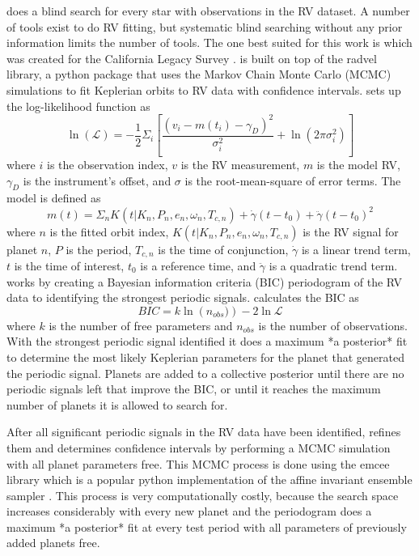 does a blind search for every star with observations in the RV
dataset. A number of tools exist to do RV fitting, but systematic
blind searching without any prior information limits the number of tools. The
one best suited for this work is  which was created for the California
Legacy Survey \citep{rosenthalCaliforniaLegacy2021}.  is built on top of the radvel library, a python
package that uses the Markov Chain Monte Carlo (MCMC) simulations to fit
Keplerian orbits to RV data with confidence intervals.  sets up the
log-likelihood function as \citep{rosenthalCaliforniaLegacy2021} 
\begin{equation}
\ln(\mathcal{L}) = -\frac{1}{2}
\Sigma_i \left[ \frac{\left(v_i - m(t_i) - \gamma_D\right)^2}{\sigma_i^2} +
\ln\left(2 \pi \sigma_i^2\right)\right]
  \label{eq:likelihoodfun}
\end{equation}
where $i$ is the observation index,
$v$ is the RV measurement, $m$ is the model RV, $\gamma_D$ is the instrument's
offset, and $\sigma$ is the root-mean-square of error terms. The model is
defined as 
\begin{equation}
m(t) = \Sigma_n K(t|K_n,P_n,e_n,\omega_n,T_{c,n}) +
\dot{\gamma}(t-t_0) + \ddot{\gamma}(t-t_0)^2
  \label{eq:rv_model}
\end{equation}
where $n$ is the fitted orbit
index, $K(t|K_n,P_n,e_n,\omega_n,T_{c,n})$ is the RV signal for planet $n$, $P$
is the period, $T_{c,n}$ is the time of conjunction, $\dot{\gamma}$ is a linear
trend term, $t$ is the time of interest, $t_0$ is a reference time, and
$\ddot{\gamma}$ is a quadratic trend term.  works by creating a
Bayesian information criteria (BIC) periodogram of the RV data to identifying
the strongest periodic signals.  calculates the BIC as 
\begin{equation}
BIC = k
\ln\left(n_{obs})\right) - 2\ln{\mathcal{L}}
  \label{eq:bic}
\end{equation}
where $k$ is the number of free
parameters and $n_{obs}$ is the number of observations. With the strongest
periodic signal identified it does a maximum *a posterior* fit to determine the
most likely Keplerian parameters for the planet that generated the periodic
signal. Planets are added to a collective posterior until there are no periodic
signals left that improve the BIC, or until it reaches the maximum number of
planets it is allowed to search for.

After all significant periodic signals in the RV data have been identified,
 refines them and determines confidence intervals by performing a MCMC
simulation with all planet parameters free. This MCMC process is done using the
emcee library \citep{emcee} which is a popular python implementation of the affine
invariant ensemble sampler \citep{Goodman2010}. This process is very computationally costly,
because the search space increases considerably with every new planet and the
periodogram does a maximum *a posterior* fit at every test period with all
parameters of previously added planets free.

